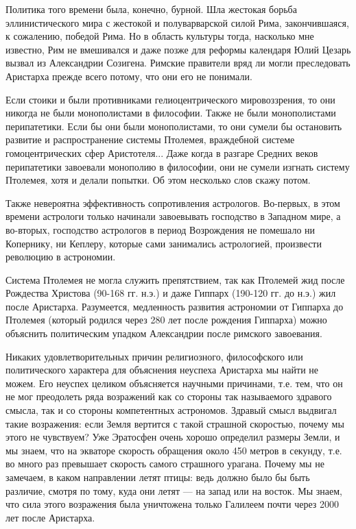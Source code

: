 Политика того времени была, конечно, бурной. Шла жестокая борьба
эллинистического мира с жестокой и полуварварской силой Рима,
закончившаяся, к сожалению, победой Рима. Но в область культуры тогда,
насколько мне известно, Рим не вмешивался и даже позже для реформы
календаря Юлий Цезарь вызвал из Александрии Созигена. Римские
правители вряд ли могли преследовать Аристарха прежде всего потому,
что они его не понимали.

Если стоики и были противниками гелиоцентрического мировоззрения, то
они никогда не были монополистами в философии. Также не были
монополистами перипатетики. Если бы они были монополистами, то они
сумели бы остановить развитие и распространение системы Птолемея,
враждебной системе гомоцентрических сфер Аристотеля... Даже когда в
разгаре Средних веков перипатетики завоевали монополию в философии,
они не сумели изгнать систему Птолемея, хотя и делали попытки. Об этом
несколько слов скажу потом.

Также невероятна эффективность сопротивления астрологов. Во-первых, в
этом времени астрологи только начинали завоевывать господство в
Западном мире, а во-вторых, господство астрологов в период Возрождения
не помешало ни Копернику, ни Кеплеру, которые сами занимались
астрологией, произвести революцию в астрономии.

Система Птолемея не могла служить препятствием, так как Птолемей жид
после Рождества Христова (90-168 гг. н.э.) и даже Гиппарх (190-120
гг. до н.э.) жил после Аристарха. Разумеется, медленность развития
астрономии от Гиппарха до Птолемея (который родился через 280 лет
после рождения Гиппарха) можно объяснить политическим упадком
Александрии после римского завоевания.

Никаких удовлетворительных причин религиозного, философского или
политического характера для объяснения неуспеха Аристарха мы найти не
можем. Его неуспех целиком объясняется научными причинами, т.е. тем,
что он не мог преодолеть ряда возражений как со стороны так
называемого здравого смысла, так и со стороны компетентных астрономов.
Здравый смысл выдвигал такие возражения: если Земля вертится с такой
страшной скоростью, почему мы этого не чувствуем? Уже Эратосфен очень
хорошо определил размеры Земли, и мы знаем, что на экваторе скорость
обращения около 450 метров в секунду, т.е. во много раз превышает
скорость самого страшного урагана. Почему мы не замечаем, в каком
направлении летят птицы: ведь должно было бы быть различие, смотря по
тому, куда они летят --- на запад или на восток. Мы знаем, что сила
этого возражения была уничтожена только Галилеем почти через 2000 лет
после Аристарха.

